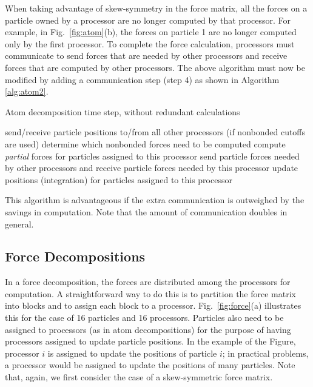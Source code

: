 When taking advantage of skew-symmetry in the force matrix,
all the forces on a particle owned by a processor are no longer computed
by that processor.  For example, in Fig.~\ref{fig:atom}(b), the forces
on particle 1 are no longer computed only by the first processor.  
To complete the force calculation,
processors must communicate to send forces that are needed by other
processors and receive forces that are computed by other processors.
The above algorithm must now be modified by adding a communication
step (step 4) as shown in Algorithm \ref{alg:atom2}.
\begin{algorithm}
\caption{Atom decomposition time step, without redundant calculations}
\label{alg:atom2}
\begin{algorithmic}[1]
\STATE send/receive particle positions to/from all other processors
\STATE (if nonbonded cutoffs are used) determine which nonbonded forces need to be computed
\STATE compute {\em partial} forces for particles assigned to this processor
\STATE send particle forces needed by other processors and receive particle forces needed by this processor
\STATE update positions (integration) for particles assigned to this processor
\end{algorithmic}
\end{algorithm}

This algorithm is advantageous if the extra communication is outweighed by
the savings in computation.  Note that the amount of communication doubles
in general.

\subsection{Force Decompositions}

In a force decomposition, the forces are distributed among the processors
for computation.  A straightforward way to do this is to partition
the force matrix into blocks and to assign each block to a processor.
Fig.~\ref{fig:force}(a) illustrates this for the case of 16 particles
and 16 processors.  
Particles also need to be assigned to processors (as in atom decompositions)
for the purpose of having processors assigned to update particle positions.
In the example of the Figure, processor $i$ is assigned to update the
positions of particle $i$; in practical problems, a processor would 
be assigned to update the positions of many particles.
Note that, again, we first consider the case of a skew-symmetric
force matrix.  

